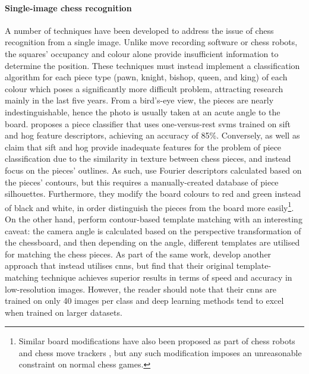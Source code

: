 \paragraph{Single-image chess recognition}
A number of techniques have been developed to address the issue of chess recognition from a single image. 
Unlike move recording software or chess robots, the squares' occupancy and colour alone provide insufficient information to determine the position. 
These techniques must instead implement a classification algorithm for each piece type (pawn, knight, bishop, queen, and king) of each colour which poses a significantly more difficult problem, attracting research mainly in the last five years.
From a bird's-eye view, the pieces are nearly indestinguishable, hence the photo is usually taken at an acute angle to the board.
\textcite{ding2016} proposes a piece classifier that uses one-versus-rest \glspl{svm} trained on \gls{sift} and \gls{hog} feature descriptors, achieving an accuracy of 85\%. 
Conversely, \textcite{danner2015} as well as \textcite{xie2018} claim that \gls{sift} and \gls{hog} provide inadequate features for the problem of piece classification due to the similarity in texture between chess pieces, and instead focus on the pieces' outlines.
As such, \textcite{danner2015} use Fourier descriptors calculated based on the pieces' contours, but this requires a manually-created database of piece silhouettes.
Furthermore, they modify the board colours to red and green instead of black and white, in order distinguish the pieces from the board more easily\footnote{Similar board modifications have also been proposed as part of chess robots \cite{banerjee2012} and chess move trackers \cite{wang2013}, but any such modification imposes an unreasonable constraint on normal chess games.}.
On the other hand, \textcite{xie2018} perform contour-based template matching with an interesting caveat: the camera angle is calculated based on the perspective transformation of the chessboard, and then depending on the angle, different templates are utilised for matching the chess pieces.
As part of the same work, \citeauthor{xie2018} develop another approach that instead utilises \glspl{cnn}, but find that their original template-matching technique achieves superior results in terms of speed and accuracy in low-resolution images.
However, the reader should note that their \glspl{cnn} are trained on only 40 images per class and deep learning methods tend to excel when trained on larger datasets.

